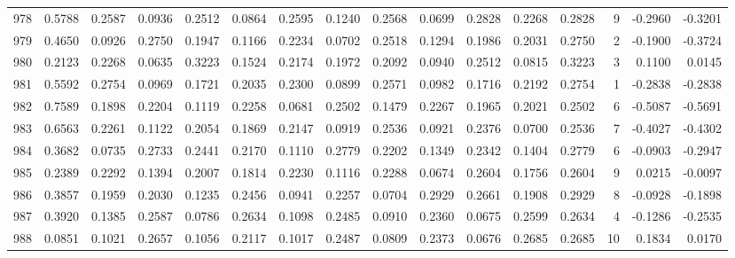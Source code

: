 \begin{tabular}{lrrrrrrrrrrrrrrr}
978 &      0.5788 &  0.2587 &  0.0936 &  0.2512 &  0.0864 &  0.2595 &  0.1240 &  0.2568 &  0.0699 &  0.2828 &   0.2268 &     0.2828 &      9 &                   -0.2960 &                    -0.3201 \\
979 &      0.4650 &  0.0926 &  0.2750 &  0.1947 &  0.1166 &  0.2234 &  0.0702 &  0.2518 &  0.1294 &  0.1986 &   0.2031 &     0.2750 &      2 &                   -0.1900 &                    -0.3724 \\
980 &      0.2123 &  0.2268 &  0.0635 &  0.3223 &  0.1524 &  0.2174 &  0.1972 &  0.2092 &  0.0940 &  0.2512 &   0.0815 &     0.3223 &      3 &                    0.1100 &                     0.0145 \\
981 &      0.5592 &  0.2754 &  0.0969 &  0.1721 &  0.2035 &  0.2300 &  0.0899 &  0.2571 &  0.0982 &  0.1716 &   0.2192 &     0.2754 &      1 &                   -0.2838 &                    -0.2838 \\
982 &      0.7589 &  0.1898 &  0.2204 &  0.1119 &  0.2258 &  0.0681 &  0.2502 &  0.1479 &  0.2267 &  0.1965 &   0.2021 &     0.2502 &      6 &                   -0.5087 &                    -0.5691 \\
983 &      0.6563 &  0.2261 &  0.1122 &  0.2054 &  0.1869 &  0.2147 &  0.0919 &  0.2536 &  0.0921 &  0.2376 &   0.0700 &     0.2536 &      7 &                   -0.4027 &                    -0.4302 \\
984 &      0.3682 &  0.0735 &  0.2733 &  0.2441 &  0.2170 &  0.1110 &  0.2779 &  0.2202 &  0.1349 &  0.2342 &   0.1404 &     0.2779 &      6 &                   -0.0903 &                    -0.2947 \\
985 &      0.2389 &  0.2292 &  0.1394 &  0.2007 &  0.1814 &  0.2230 &  0.1116 &  0.2288 &  0.0674 &  0.2604 &   0.1756 &     0.2604 &      9 &                    0.0215 &                    -0.0097 \\
986 &      0.3857 &  0.1959 &  0.2030 &  0.1235 &  0.2456 &  0.0941 &  0.2257 &  0.0704 &  0.2929 &  0.2661 &   0.1908 &     0.2929 &      8 &                   -0.0928 &                    -0.1898 \\
987 &      0.3920 &  0.1385 &  0.2587 &  0.0786 &  0.2634 &  0.1098 &  0.2485 &  0.0910 &  0.2360 &  0.0675 &   0.2599 &     0.2634 &      4 &                   -0.1286 &                    -0.2535 \\
988 &      0.0851 &  0.1021 &  0.2657 &  0.1056 &  0.2117 &  0.1017 &  0.2487 &  0.0809 &  0.2373 &  0.0676 &   0.2685 &     0.2685 &     10 &                    0.1834 &                     0.0170 \\

\end{tabular}
